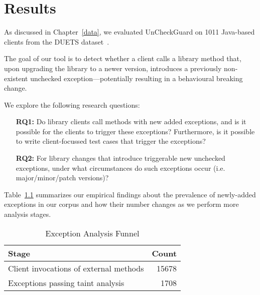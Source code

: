\chapter{Results}\label{results}
As discussed in Chapter~\ref{data}, we evaluated UnCheckGuard on 1011 Java-based clients from the DUETS dataset~\cite{durieux21:_duets}.

The goal of our tool is to detect whether a client calls a library method that, upon upgrading the library to a newer version, introduces a previously non-existent unchecked exception—potentially resulting in a behavioural breaking change.

We explore the following research questions:

\begin{itemize}
  \item[\textbf{RQ1:}] Do library clients call methods with new added exceptions, and is it possible for the clients to trigger these exceptions? Furthermore, is it possible to write client-focussed test cases that trigger the exceptions?
  \item[\textbf{RQ2:}] For library changes that introduce triggerable new unchecked exceptions, under what circumstances do such exceptions occur (i.e. major/minor/patch versions)?
\end{itemize}

Table~\ref{tab:exception-funnel} summarizes our empirical findings about the prevalence of newly-added exceptions in our corpus and how their number changes as we perform more analysis stages.

\begin{table}[h]
\centering
\caption{Exception Analysis Funnel}
\label{tab:exception-funnel}
\begin{tabular}{l r}
\toprule
\textbf{Stage} & \textbf{Count} \\
\midrule
Client invocations of external methods & 15678 \\
Exceptions passing taint analysis & 1708 \\
\bottomrule
\end{tabular}
\end{table}


